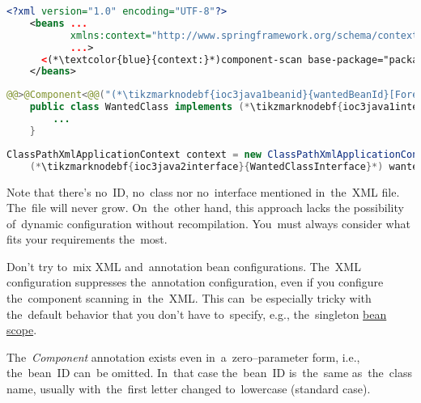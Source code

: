 \example
\begin{lstlisting}[language=XML, title={Configuration XML}]
    <?xml version="1.0" encoding="UTF-8"?>
    <beans ...
           xmlns:context="http://www.springframework.org/schema/context"
           ...>
      <(*\textcolor{blue}{context:}*)component-scan base-package="package.subfolder"/>
    </beans>
\end{lstlisting}
\begin{lstlisting}[language=Java, title={Wanted class}]
    @@>@Component<@@("(*\tikzmarknodebf{ioc3java1beanid}{wantedBeanId}[ForestGreen]*)")
    public class WantedClass implements (*\tikzmarknodebf{ioc3java1interface}{WantedClassInterface}*) {
        ...
    }
\end{lstlisting}
\begin{lstlisting}[language=Java, title={Usage}]
    ClassPathXmlApplicationContext context = new ClassPathXmlApplicationContext("configurationFile.xml");
    (*\tikzmarknodebf{ioc3java2interface}{WantedClassInterface}*) wantedClassInstance = context.getBean("(*\tikzmarknodebf{ioc3java2beanid}{wantedBeanId}[ForestGreen]*)", (*\tikzmarknodebf{ioc3java2interface2}{WantedClassInterface}*).class);
\end{lstlisting}

\noindent Note that there's no~ID, no~class nor no~interface mentioned in~the~XML file. The~file will never grow. On~the~other hand, this approach  lacks the possibility of~dynamic configuration without recompilation. You~must always consider what fits your requirements the~most.

\warning Don't try to~mix XML and~annotation bean configurations. The~XML configuration suppresses the~annotation configuration, even if you configure the~component scanning in~the~XML. This can~be especially tricky with the~default behavior that you don't have to~specify, e.g., the~singleton \hyperref[beanscope]{bean scope}.
\newpage

\noindent The~\textit{Component} annotation exists even in~a~zero--parameter form, i.e., the~bean~ID can~be omitted. In~that case the~bean~ID is~the~same as~the~class name, usually with~the~first letter changed to~lowercase (standard case).

